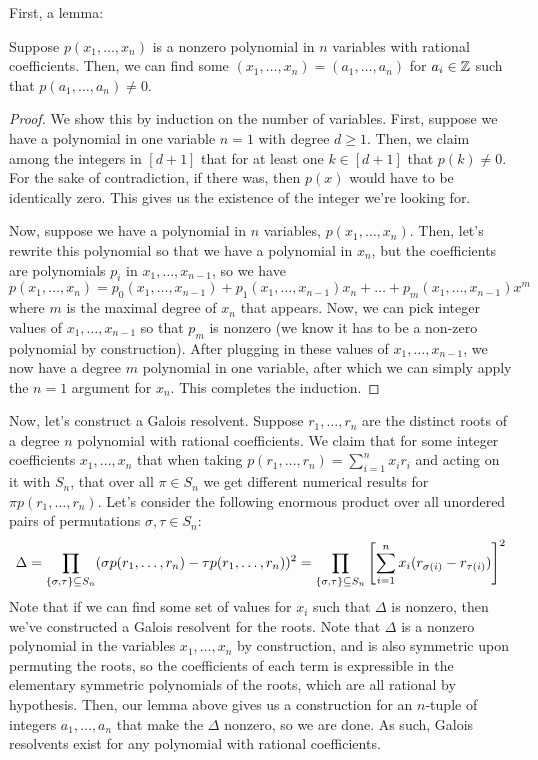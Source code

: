 \documentclass[12pt]{scrartcl}
\begin{document}
First, a lemma: 
\begin{lemma}
Suppose $p(x_1, \dots, x_n)$ is a nonzero polynomial in $n$ variables with rational coefficients. Then, we can find some $(x_1, \dots, x_n) = (a_1, \dots, a_n)$ for $a_i \in \mathbb Z$ such that $p(a_1, \dots, a_n) \neq 0$. 
\end{lemma}
\begin{proof}
We show this by induction on the number of variables. First, suppose we have a polynomial in one variable $n = 1$ with degree $d \geq 1$. Then, we claim among the integers in $[d+1]$ that for at least one $k \in [d+1]$ that $p(k) \neq 0$. For the sake of contradiction, if there was, then $p(x)$ would have to be identically zero. This gives us the existence of the integer we're looking for. 

Now, suppose we have a polynomial in $n$ variables, $p(x_1, \dots, x_n)$. Then, let's rewrite this polynomial so that we have a polynomial in $x_n$, but the coefficients are polynomials $p_i$ in $x_1, \dots, x_{n-1}$, so we have 
\[
    p(x_1, \dots, x_n) = p_0(x_1, \dots, x_{n-1}) + p_1(x_1, \dots, x_{n-1}) x_n + \dots + p_m(x_1, \dots, x_{n-1}) x^m
\]
where $m$ is the maximal degree of $x_n$ that appears. Now, we can pick integer values of $x_1, \dots, x_{n-1}$ so that $p_m$ is nonzero (we know it has to be a non-zero polynomial by construction). After plugging in these values of $x_1, \dots, x_{n-1}$, we now have a degree $m$ polynomial in one variable, after which we can simply apply the $n = 1$ argument for $x_n$. This completes the induction. 
\end{proof}
Now, let's construct a Galois resolvent. Suppose $r_1, \dots, r_n$ are the distinct roots of a degree $n$ polynomial with rational coefficients. We claim that for some integer coefficients $x_1, \dots, x_n$ that when taking $p(r_1, \dots, r_n) = \sum_{i = 1}^n x_i r_i$ and acting on it with $S_n$, that over all $\pi \in S_n$ we get different numerical results for $\pi p(r_1, \dots, r_n)$. Let's consider the following enormous product over all unordered pairs of permutations $\sigma, \tau \in S_n$: 
\[
    \Delta = \prod_{\left\{ \sigma, \tau \right\} \subseteq S_n} (\sigma p(r_1, \dots, r_n) - \tau p(r_1, \dots, r_n))^2 = \prod_{\left\{ \sigma, \tau \right\} \subseteq S_n} \left[ \sum_{i = 1}^n x_i (r_{\sigma(i)} - r_{\tau(i)})\right]^2
\]
Note that if we can find some set of values for $x_i$ such that $\Delta$ is nonzero, then we've constructed a Galois resolvent for the roots. Note that $\Delta$ is a nonzero polynomial in the variables $x_1, \dots, x_n$ by construction, and is also symmetric upon permuting the roots, so the coefficients of each term is expressible in the elementary symmetric polynomials of the roots, which are all rational by hypothesis. Then, our lemma above gives us a construction for an $n$-tuple of integers $a_1, \dots, a_n$ that make the $\Delta$ nonzero, so we are done. As such, Galois resolvents exist for any polynomial with rational coefficients. 
\end{document}
